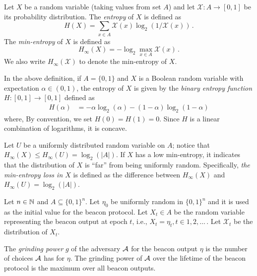 \begin{definition}
    Let $X$ be a random variable (taking values from set $A$) 
    and let $\mathcal{X} : A \rightarrow [0,1]$ be its probability distribution.
    The \emph{entropy} of $X$ is defined as 
    \begin{equation}\label{def:entropy}
        H(X) = \sum_{x \in A} \mathcal{X}(x) \log_2 (1/\mathcal{X}(x))
        \,.
    \end{equation}
    The \emph{min-entropy} of $X$ is defined as 
    \begin{equation}\label{def:min-entropy}
        H_\infty(X) = - \log_2 \max_{x \in A} \mathcal{X}(x)
        \,.
    \end{equation}
    We also write $H_\infty(\mathcal{X})$ to denote the min-entropy of $X$.
\end{definition}
\noindent

In the above definition, 
if $A = \{0,1\}$ and $X$ is a Boolean random variable with expectation $\alpha \in (0,1)$, 
the entropy of $X$ is given by 
the \emph{binary entropy function} $H: [0,1] \rightarrow [0,1]$ defined as 
\begin{align}\label{eq:binary-entropy}
    H(\alpha) &= -\alpha \log_2(\alpha) - (1-\alpha) \log_2(1-\alpha)
\end{align}
where, By convention, we set $H(0) = H(1) = 0$. 
Since $H$ is a linear combination of logarithms, it is concave. 

Let $U$ be a uniformly distributed random variable on $A$; 
notice that $H_\infty(X) \leq H_\infty(U) = \log_2(|A|)$. 
If $X$ has a low min-entropy, 
it indicates that the distribution of $X$ is ``far'' from being uniformly random. 
Specifically, \emph{the min-entropy loss in $X$} 
is defined as the difference between $H_\infty(X)$ and $H_\infty(U) = \log_2(|A|)$.


Let $n \in \mathbb{N}$ and $A \subseteq \{0,1\}^n$.
Let $\eta_0$ be uniformly random in $\{0,1\}^n$ 
and it is used as the initial value for the beacon protocol. 
Let $X_t \in A$ be the random variable 
representing the beacon output at epoch $t$, 
i.e., $X_t = \eta_t, t \in 1, 2, \ldots$\,. 
Let $\mathcal{X}_t$ be the distribution of $X_t$. 

\begin{definition}\label{def:grinding-power-num-choices}
The \emph{grinding power} $g$ of the adversary $\mathcal{A}$ 
for the beacon output $\eta$
is the number of choices $\mathcal{A}$ has for $\eta$. 
The grinding power of $\mathcal{A}$ over 
the lifetime of the beacon protocol
is the maximum over all beacon outputs.
\end{definition}

